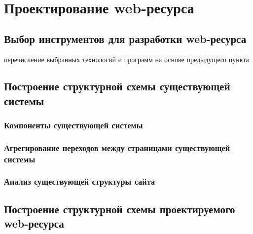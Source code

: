 %
%

\section{Проектирование web-ресурса}
    \subsection{Выбор инструментов для разработки web-ресурса}
        перечисление выбранных технологий и программ на основе предыдущего пункта
        
    \subsection{Построение структурной схемы существующей системы}
        \subsubsection{Компоненты существующей системы}                                         %

        \subsubsection{Агрегирование переходов между страницами существующей системы}          %

        \subsubsection{Анализ существующей структуры сайта}                                   %

    \subsection{Построение структурной схемы проектируемого web-ресурса}
